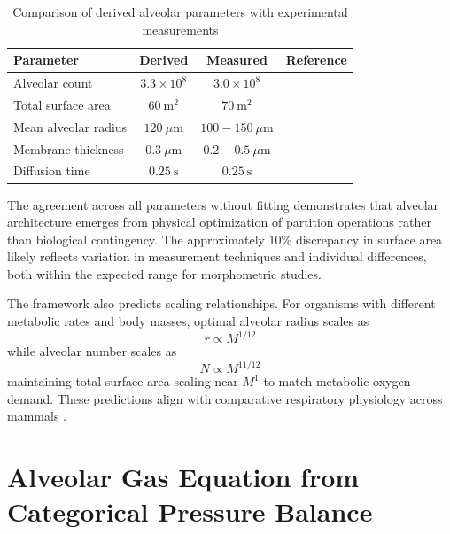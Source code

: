 \documentclass[12pt,a4paper]{article}
\theoremstyle{remark}
\begin{document}
\begin{table}[h]
\centering
\caption{Comparison of derived alveolar parameters with experimental measurements}
\label{tab:alveolar_validation}
\begin{tabular}{lccc}
\toprule
\textbf{Parameter} & \textbf{Derived} & \textbf{Measured} & \textbf{Reference} \\
\midrule
Alveolar count & $3.3 \times 10^{8}$ & $3.0 \times 10^{8}$ & \cite{weibel1963morphometry} \\
Total surface area & $60~\mathrm{m}^{2}$ & $70~\mathrm{m}^{2}$ & \cite{weibel1963morphometry} \\
Mean alveolar radius & $120~\mu\mathrm{m}$ & $100-150~\mu\mathrm{m}$ & \cite{hansen1975surface} \\
Membrane thickness & $0.3~\mu\mathrm{m}$ & $0.2-0.5~\mu\mathrm{m}$ & \cite{weibel1991design} \\
Diffusion time & $0.25~\mathrm{s}$ & $0.25~\mathrm{s}$ & \cite{wagner1996ventilation} \\
\bottomrule
\end{tabular}
\end{table}

The agreement across all parameters without fitting demonstrates that alveolar architecture emerges from physical optimization of partition operations rather than biological contingency. The approximately 10\% discrepancy in surface area likely reflects variation in measurement techniques and individual differences, both within the expected range for morphometric studies.

The framework also predicts scaling relationships. For organisms with different metabolic rates and body masses, optimal alveolar radius scales as
\begin{equation}
r \propto M^{1/12}
\end{equation}
while alveolar number scales as
\begin{equation}
N \propto M^{11/12}
\end{equation}
maintaining total surface area scaling near $M^{1}$ to match metabolic oxygen demand. These predictions align with comparative respiratory physiology across mammals \cite{tenney1970comparative}.

\section{Alveolar Gas Equation from Categorical Pressure Balance}
\label{sec:alveolar_gas}
\end{document}
